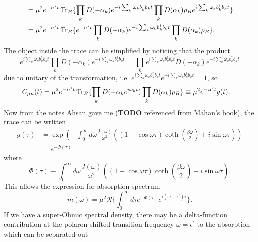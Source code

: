 \documentclass[]{article}
\begin{document}
\begin{itemize}
\begin{itemize}
\begin{equation}
\begin{split}
&=  \mu^2 e^{- i \epsilon^{\prime}t}\Tr_{B}\{\prod_k D(- \alpha_k) e^{- i\sum_k \omega_k b_k^{\dagger}b_k t} \prod_k D(\alpha_k)\rho_{B} e^{ i\sum_k \omega_k b_k^{\dagger}b_k t}\} \\
&=  \mu^2 e^{- i \epsilon^{\prime}t}\Tr_{B}\{e^{- i \epsilon^{\prime}t}\prod_k D(- \alpha_k) e^{- i\sum_k \omega_k b_k^{\dagger}b_k t} \prod_k D(\alpha_k)\rho_{B} \}.
\end{split}
\end{equation}
The object inside the trace can be simplified by noticing that the product
\begin{equation}
e^{ i\sum_k \omega_k b_k^{\dagger}b_k t} \prod_k D(- \alpha_k) e^{- i\sum_k \omega_k b_k^{\dagger}b_k t} = \prod_k e^{ i\sum_k \omega_k b_k^{\dagger}b_k t} D(- \alpha_k) e^{- i\sum_k \omega_k b_k^{\dagger}b_k t}
\end{equation}
due to unitary of the transformation, i.e. $  e^{i\sum_k \omega_k b_k^{\dagger}b_k t} e^{- i\sum_k \omega_k b_k^{\dagger}b_k t}=1$, so
\begin{equation}
\begin{split}
C_{\mu \mu}(t) &=  \mu^2 e^{- i \epsilon^{\prime}t}\Tr_{B}\{\prod_k D(- \alpha_k e^{i\omega_k t})  \prod_k D(\alpha_k)\rho_{B} \} \equiv \mu^2 e^{- i \epsilon^{\prime}t}g(t).
\end{split}
\end{equation}
Now from the notes Ahsan gave me (\textbf{TODO} referenced from Mahan's book), the trace can be written
\begin{equation}
\begin{split}
g(\tau) &= \exp(-\int_{0}^{\infty}d\omega \frac{J(\omega)}{\omega^2}((1-\cos\omega\tau)\coth(\frac{\beta\omega}{2})+i\sin\omega\tau)) \\
&=  e^{-\Phi(\tau)}
\end{split}
\end{equation}
where 
\begin{equation}
\Phi(\tau) \equiv \int_{0}^{\infty}d\omega\frac{J(\omega)}{\omega^2}((1-\cos\omega\tau)\coth(\frac{\beta\omega}{2})+i\sin\omega\tau).
\end{equation}
This allows the expression for absorption spectrum
\begin{equation}
m(\omega) = \mu^2\mathcal{R}\{\int_{0}^{\infty}d\tau e^{-\Phi(\tau)} e^{i(\omega-\epsilon^{\prime})\tau}\}.
\end{equation}
If we have a super-Ohmic spectral density, there may be a delta-function contribution at the polaron-shifted transition frequency $\omega=\epsilon^{\prime}$ to the absorption which can be separated out

\end{itemize}
\end{itemize}
\end{document}
